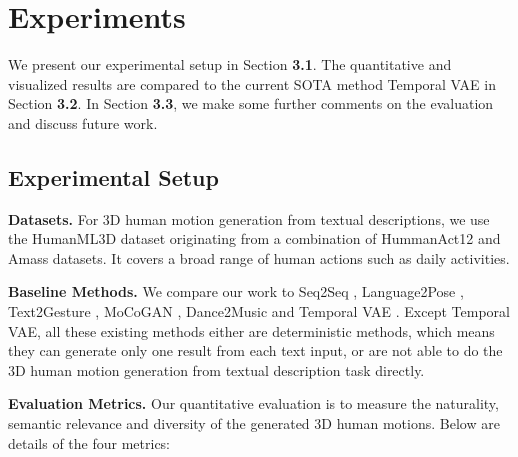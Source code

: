 \documentclass{article}
\begin{document}
\section{Experiments}

We present our experimental setup in Section \textbf{3.1}. The quantitative and visualized results are compared to the current SOTA method Temporal VAE \cite{guo2022generating} in Section \textbf{3.2}. In Section \textbf{3.3}, we make some further comments on the evaluation and discuss future work.

\subsection{Experimental Setup}

\noindent \textbf{Datasets.} For 3D human motion generation from textual descriptions, we use the HumanML3D \cite{guo2022generating} dataset originating from a combination of HummanAct12 \cite{guo2020action2motion} and Amass \cite{mahmood2019amass} datasets. It covers a broad range of human actions such as daily activities.

\noindent \textbf{Baseline Methods.} We compare our work to Seq2Seq \cite{linvigil18}, Language2Pose \cite{ahuja2019language2pose}, Text2Gesture \cite{bhattacharya2021text2gestures}, MoCoGAN \cite{tulyakov2018mocogan}, Dance2Music \cite{tang2018dance} and Temporal VAE \cite{guo2022generating}. Except Temporal VAE, all these existing methods either are deterministic methods, which means they can generate only one result from each text input, or are not able to do the 3D human motion generation from textual description task directly. 

\noindent \textbf{Evaluation Metrics.} Our quantitative evaluation is to measure the naturality, semantic relevance and diversity of the generated 3D human motions. Below are details of the four metrics:
\end{document}
